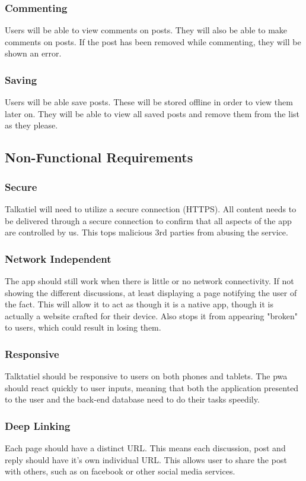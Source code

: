 \documentclass[12pt]{article}
\begin{document}
\subsubsection{Commenting}
Users will be able to view  comments on posts. They will also be able to make comments on posts. If the post has been removed while commenting, they will be shown an error.
\subsubsection{Saving}
Users will be able save posts. These will be stored offline in order to view them later on. They will be able to view all saved posts and remove them from the list as they please.
\subsection{Non-Functional Requirements}
\subsubsection{Secure}
Talkatiel will need to utilize a secure connection (HTTPS).
All content needs to be delivered through a secure connection to confirm that all aspects of the app are controlled by us.  This tops malicious 3rd parties from abusing the service.
\subsubsection{Network Independent}
The app should still work when there is little or no network connectivity.
If not showing the different discussions, at least displaying a page notifying the user of the fact.  This will allow it to act as though it is a native app, though it is actually a website crafted for their device.  Also stops it from appearing "broken" to users, which could result in losing them.
\subsubsection{Responsive}
Talktatiel should be responsive to users on both phones and tablets.  The pwa should react quickly to user inputs, meaning that both the application presented to the user and the back-end database need to do their tasks speedily.
\subsubsection{Deep Linking}
Each page should have a distinct URL.  This means each discussion, post and reply should have it's own individual URL.  This allows user to share the post with others, such as on facebook or other social media services.
\end{document}
